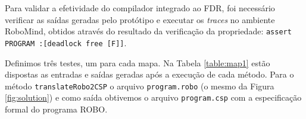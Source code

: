 Para validar a efetividade do compilador integrado ao FDR, foi necessário verificar as saídas geradas pelo protótipo e executar os \textit{traces} no ambiente RoboMind, obtidos através do resultado da verificação da propriedade: \texttt{assert PROGRAM :[deadlock free [F]]}.

Definimos três testes, um para cada mapa. Na Tabela \ref{table:map1} estão dispostas as entradas e saídas geradas após a execução de cada método. Para o método \texttt{translateRobo2CSP} o arquivo \texttt{program.robo} (o mesmo da Figura \ref{fig:solution}) e  como saída obtivemos o arquivo \texttt{program.csp} com a especificação formal do programa ROBO.

\begin{table}
\caption{Entradas e saídas para o mapa 1}
\label{table:map1}
\end{table}

\begin{table}[]
\label{tab:map2}
\caption{Entradas e saídas para o mapa 2}
\end{table}

\begin{table}[]
\label{tab:map3}
\caption{Entradas e saídas para o mapa 3}
\end{table}

